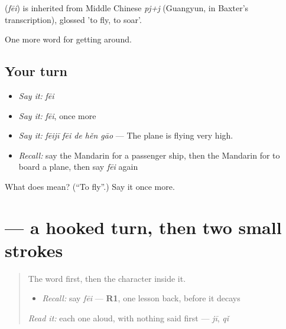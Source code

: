 \begin{cousinweb}
\textbf{} (\emph{fēi}) is inherited from Middle Chinese \emph{pj+j} (Guangyun, in Baxter's transcription), glossed 'to fly, to soar'.
\end{cousinweb}

\begin{grammarlens}[title={What you've built}]
One more word for getting around.
\end{grammarlens}

\subsection*{Your turn}
\begin{itemize}
\raggedright
  \item \emph{Say it:} \emph{fēi}
  \item \emph{Say it:} \emph{fēi}, once more
  \item \emph{Say it:} \emph{fēijī fēi de hěn gāo} — The plane is flying very high.
  \item \emph{Recall:} say the Mandarin for a passenger ship, then the Mandarin for to board a plane, then say \emph{fēi} again
\end{itemize}

\begin{tcolorbox}[breakable,colback=teal!4,colframe=teal!35!black,title={Before you move on}]
What does  mean? (\textquotedblleft{}To fly\textquotedblright{}.) Say it once more.
\end{tcolorbox}
\section[\texorpdfstring{\zh{飞} (fēi)}{飞 (fēi)}]{ — a hooked turn, then two small strokes}

\label{lesson:ZH-W413-fei-fly}



\begin{quote}
The word first, then the character inside it.

\begin{itemize}
\raggedright
  \item \emph{Recall:} say \emph{fēi} — \textbf{R1}, one lesson back, before it decays
\end{itemize}

\begin{quote}
 
\end{quote}

\emph{Read it:} each one aloud, with nothing said first — \emph{jī}, \emph{qǐ}
\end{quote}

